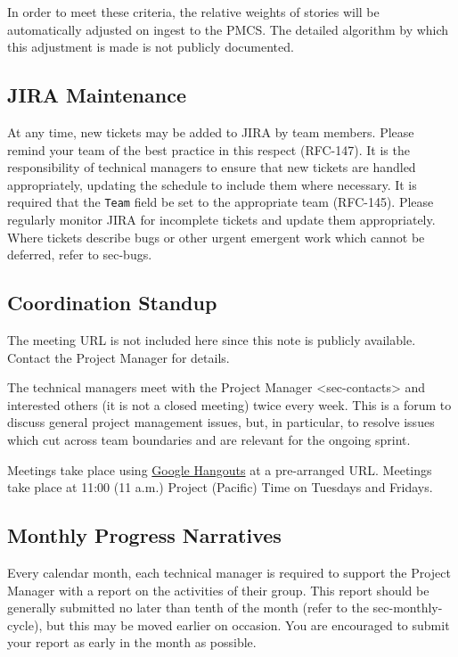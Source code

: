 In order to meet these criteria, the relative weights of stories will be
automatically adjusted on ingest to the PMCS. The detailed algorithm by
which this adjustment is made is not publicly documented.

\subsection{JIRA Maintenance}\label{jira-maintenance}

At any time, new tickets may be added to JIRA by team members. Please
remind your team of the best practice in this respect (RFC-147). It is
the responsibility of technical managers to ensure that new tickets are
handled appropriately, updating the schedule to include them where
necessary. It is required that the \texttt{Team} field be set to the
appropriate team (RFC-145). Please regularly monitor JIRA for incomplete
tickets and update them appropriately. Where tickets describe bugs or
other urgent emergent work which cannot be deferred, refer to sec-bugs.

\subsection{Coordination Standup}\label{coordination-standup}

The meeting URL is not included here since this note is publicly
available. Contact the Project Manager for details.

The technical managers meet with the
Project Manager \textless{}sec-contacts\textgreater{} and interested
others (it is not a closed meeting) twice every week. This is a forum to
discuss general project management issues, but, in particular, to
resolve issues which cut across team boundaries and are relevant for the
ongoing sprint.

Meetings take place using \href{https://hangouts.google.com/}{Google
Hangouts} at a pre-arranged URL. Meetings take place at 11:00 (11 a.m.)
Project (Pacific) Time on Tuesdays and Fridays.

\subsection{Monthly Progress
Narratives}\label{monthly-progress-narratives}

Every calendar month, each technical manager is required to support the
Project Manager with a report on the activities of their group. This
report should be generally submitted no later than tenth of the month
(refer to the sec-monthly-cycle), but this may be moved earlier on
occasion. You are encouraged to submit your report as early in the month
as possible.

